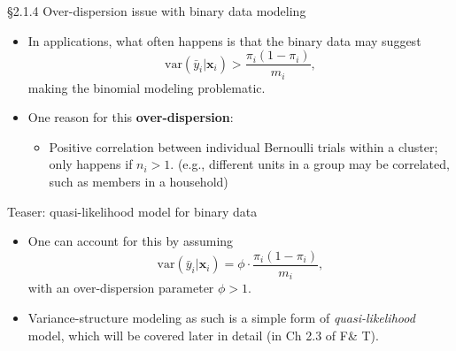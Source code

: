 \documentclass{beamer}
\newenvironment{wideitemize}%
  {\begin{itemize}%
    \setlength{\parskip}{1em}}%
  {\end{itemize}}
\begin{document}
\begin{frame}{\S2.1.4 Over-dispersion issue with binary data modeling}
\begin{wideitemize}

\item In applications, what  often happens is that the binary data may suggest  
\[
\mbox{var}(\bar{y}_i|\textbf{x}_i) > \frac{\pi_i(1-\pi_i)}{m_i},
\]  making the binomial modeling problematic. 

\item One  reason for this  \textbf{over-dispersion}:
\begin{itemize}
\item
Positive correlation between individual Bernoulli trials within a cluster; only happens if $n_i > 1$. (e.g., different units in a group may be correlated, such as members in a household)
\end{itemize}
\end{wideitemize}
\end{frame}

\begin{frame}{Teaser: quasi-likelihood model for binary data}
\begin{wideitemize}
\item
One can account for this by assuming 
\[\mbox{var}(\bar{y}_i|\textbf{x}_i) =\phi\cdot\frac{\pi_i(1-\pi_i)}{m_i},
\]
with an over-dispersion parameter $\phi>1$. 

\item Variance-structure modeling as such is a simple form of  \emph{quasi-likelihood} model, which will be covered later in detail (in Ch 2.3 of F\& T). 




\end{wideitemize}

\end{frame}
\end{document}

